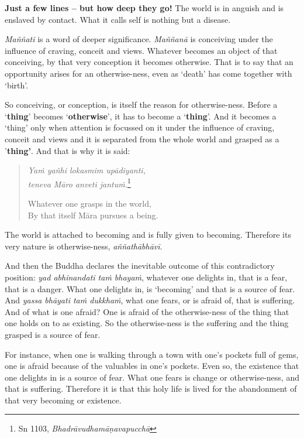 \textbf{Just a few lines -- but how deep they go!} The world is in anguish and is enslaved by contact. What it calls self is nothing but a disease.

\emph{Maññati} is a word of deeper significance. \emph{Maññanā} is conceiving under the influence of craving, conceit and views. Whatever becomes an object of that conceiving, by that very conception it becomes otherwise. That is to say that an opportunity arises for an otherwise-ness, even as `death' has come together with `birth'.

So conceiving, or conception, is itself the reason for otherwise-ness. Before a `\textbf{thing}' becomes `\textbf{otherwise}', it has to become a `\textbf{thing}'. And it becomes a `thing' only when attention is focussed on it under the influence of craving, conceit and views and it is separated from the whole world and grasped as a '\textbf{thing'}. And that is why it is said:

\begin{quote}
\emph{Yaṁ yañhi lokasmim upādiyanti,}\\
\emph{teneva Māro anveti jantuṁ.}\footnote{Sn 1103, \emph{Bhadrāvudhamāṇavapucchā}}

Whatever one grasps in the world,\\
By that itself Māra pursues a being.
\end{quote}

The world is attached to becoming and is fully given to becoming. Therefore its very nature is otherwise-ness, \emph{aññathābhāvī}.

And then the Buddha declares the inevitable outcome of this contradictory position: \emph{yad abhinandati taṁ bhayaṁ}, whatever one delights in, that is a fear, that is a danger. What one delights in, is `becoming' and that is a source of fear. And \emph{yassa bhāyati taṁ dukkhaṁ}, what one fears, or is afraid of, that is suffering. And of what is one afraid? One is afraid of the otherwise-ness of the thing that one holds on to as existing. So the otherwise-ness is the suffering and the thing grasped is a source of fear.

For instance, when one is walking through a town with one's pockets full of gems, one is afraid because of the valuables in one's pockets. Even so, the existence that one delights in is a source of fear. What one fears is change or otherwise-ness, and that is suffering. Therefore it is that this holy life is lived for the abandonment of that very becoming or existence.

